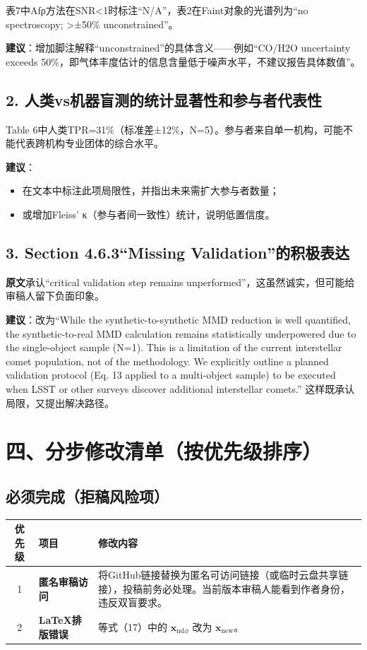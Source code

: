 \documentclass[12pt]{article}
\begin{document}
表7中Afρ方法在SNR<1时标注“N/A”，表2在Faint对象的光谱列为“no spectroscopy; >±50\% unconstrained”。

\textbf{建议}：增加脚注解释“unconstrained”的具体含义——例如“CO/H2O uncertainty exceeds 50\%，即气体丰度估计的信息含量低于噪声水平，不建议报告具体数值”。

\subsection{2. 人类vs机器盲测的统计显著性和参与者代表性}

Table 6中人类TPR=31\%（标准差±12\%，N=5）。参与者来自单一机构，可能不能代表跨机构专业团体的综合水平。

\textbf{建议}：
\begin{itemize}
    \item 在文本中标注此项局限性，并指出未来需扩大参与者数量；
    \item 或增加Fleiss’ κ（参与者间一致性）统计，说明低置信度。
\end{itemize}

\subsection{3. Section 4.6.3“Missing Validation”的积极表达}

\textbf{原文}承认“critical validation step remains unperformed”，这虽然诚实，但可能给审稿人留下负面印象。

\textbf{建议}：改为“While the synthetic-to-synthetic MMD reduction is well quantified, the synthetic-to-real MMD calculation remains statistically underpowered due to the single-object sample (N=1). This is a limitation of the current interstellar comet population, not of the methodology. We explicitly outline a planned validation protocol (Eq. 13 applied to a multi-object sample) to be executed when LSST or other surveys discover additional interstellar comets.” 这样既承认局限，又提出解决路径。

\section{四、分步修改清单（按优先级排序）}

\subsection{必须完成（拒稿风险项）}

\begin{tabular}{|c|l|p{8cm}|}
\hline
优先级 & 项目 & 修改内容 \\
\hline
1 & \textbf{匿名审稿访问} & 将GitHub链接替换为匿名可访问链接（或临时云盘共享链接），投稿前务必处理。当前版本审稿人能看到作者身份，违反双盲要求。 \\
\hline
2 & \textbf{LaTeX排版错误} & 等式（17）中的 \(\mathbf{x}_{\mathrm{nd}\phi}\) 改为 \(\mathbf{x}_{\mathrm{new}}\)。 \\
\hline
\end{tabular}
\end{document}
